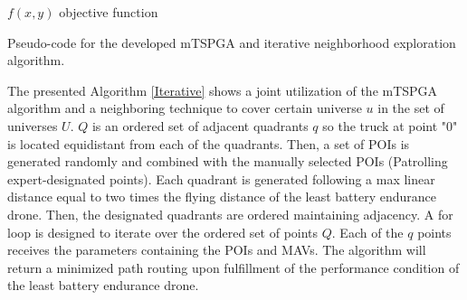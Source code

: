 \documentclass[preprint,review, 11pt,3p,authoryear]{elsarticle}
\begin{document}
{\begin{algorithm}
\begin{algorithmic}
  
  
\ENDWHILE
  \RETURN $f(x,y)$ objective function
  
  
  \ENDFOR
  
\end{algorithmic}
\caption{Pseudo-code for the developed mTSPGA and iterative neighborhood exploration algorithm.\label{Iterative}}

\end{algorithm}

The presented Algorithm \ref{Iterative} shows a joint utilization of the mTSPGA algorithm and a neighboring technique to cover certain universe $u$ in the set of universes $U$. $Q$ is an ordered set of adjacent quadrants $q$ so the truck at point "0" is located equidistant from each of the quadrants. Then, a set of POIs is generated randomly and combined with the manually selected POIs (Patrolling expert-designated points). Each quadrant is generated following a max linear distance equal to two times the flying distance of the least battery endurance drone. Then, the designated quadrants are ordered maintaining adjacency. A for loop is designed to iterate over the ordered set of points $Q$. Each of the $q$ points receives the parameters containing the POIs and MAVs. The algorithm will return a minimized path routing upon fulfillment of the performance condition of the least battery endurance drone. \\






}
\end{document}
